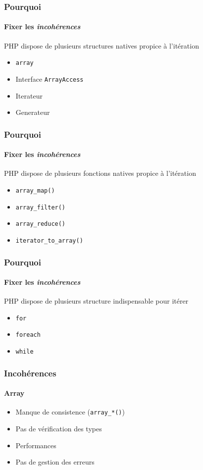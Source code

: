 \begin{frame}
	\frametitle{Pourquoi}
    \framesubtitle{Fixer les \textit{incohérences}}

    PHP dispose de plusieurs structures natives propice à l'itération

    \begin{itemize}[<+->]
        \item \texttt{array}
        \item Interface \texttt{ArrayAccess}
        \item Iterateur
        \item Generateur
    \end{itemize}
\end{frame}

\begin{frame}
	\frametitle{Pourquoi}
    \framesubtitle{Fixer les \textit{incohérences}}

    PHP dispose de plusieurs fonctions natives propice à l'itération

    \begin{itemize}[<+->]
        \item \texttt{array\_map()}
        \item \texttt{array\_filter()}
        \item \texttt{array\_reduce()}
        \item \texttt{iterator\_to\_array()}
    \end{itemize}
\end{frame}

\begin{frame}
	\frametitle{Pourquoi}
    \framesubtitle{Fixer les \textit{incohérences}}

    PHP dispose de plusieurs structure indispensable pour itérer

    \begin{itemize}[<+->]
        \item \texttt{for}
        \item \texttt{foreach}
        \item \texttt{while}
    \end{itemize}
\end{frame}

\begin{frame}
	\frametitle{Incohérences}
    \framesubtitle{Array}

    \begin{itemize}[<+->]
        \item Manque de consistence (\texttt{array\_*()})
        \item Pas de vérification des types
        \item Performances
        \item Pas de gestion des erreurs
    \end{itemize}
\end{frame}

